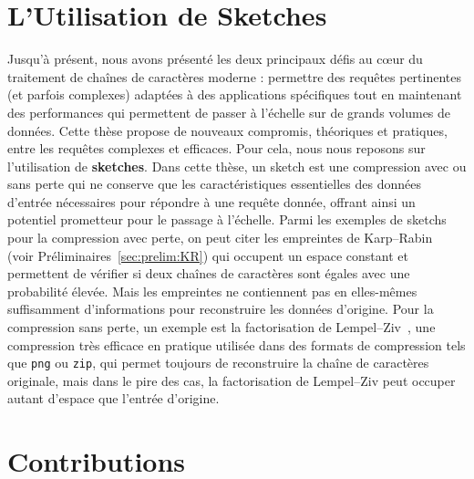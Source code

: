 \section*{L'Utilisation de Sketches}

Jusqu'à présent, nous avons présenté les deux principaux défis au cœur du traitement de chaînes de caractères moderne : permettre des requêtes pertinentes (et parfois complexes) adaptées à des applications spécifiques tout en maintenant des performances qui permettent de passer à l'échelle sur de grands volumes de données.
%
Cette thèse propose de nouveaux compromis, théoriques et pratiques, entre les requêtes complexes et efficaces. Pour cela, nous nous reposons sur l'utilisation de \textbf{sketches}.
%
Dans cette thèse, un sketch est une compression avec ou sans perte qui ne conserve que les caractéristiques essentielles des données d'entrée nécessaires pour répondre à une requête donnée, offrant ainsi un potentiel prometteur pour le passage à l'échelle. 
Parmi les exemples de sketchs pour la compression avec perte, on peut citer les empreintes de Karp--Rabin~\cite{KRfingerprint} (voir Préliminaires~\ref{sec:prelim:KR}) qui occupent un espace constant et permettent de vérifier si deux chaînes de caractères sont égales avec une probabilité élevée. Mais les empreintes ne contiennent pas en elles-mêmes suffisamment d'informations pour reconstruire les données d'origine.
Pour la compression sans perte, un exemple est la factorisation de Lempel--Ziv~\cite{ziv1977universal}, une compression très efficace en pratique utilisée dans des formats de compression tels que \texttt{png} ou \texttt{zip}, qui permet toujours de reconstruire la chaîne de caractères originale, mais dans le pire des cas, la factorisation de Lempel--Ziv peut occuper autant d'espace que l'entrée d'origine.

\section*{Contributions}

